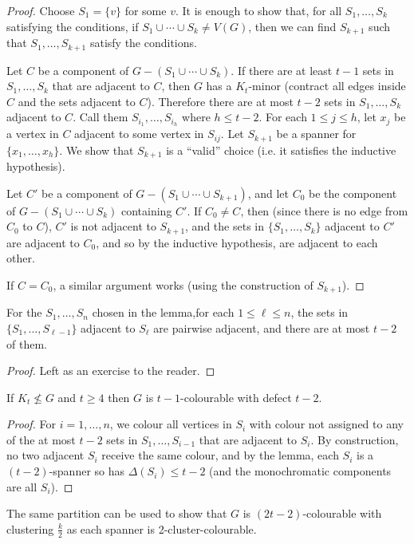 \documentclass[main.tex]{subfiles}
\begin{document}
\begin{proof}
  Choose $S_1 = \{v\}$ for some $v$.
  It is enough to show that, for all $S_1,\ldots,S_k$ satisfying the conditions,
  if $S_1\cup\cdots\cup S_k\neq V(G)$, then we can find $S_{k+1}$ such that
  $S_1,\ldots,S_{k+1}$ satisfy the conditions.

  Let $C$ be a component of $G - (S_1\cup\cdots\cup S_k)$.
  If there are at least $t-1$ sets in $S_1,\ldots,S_k$ that are adjacent to $C$,
  then $G$ has a $K_t$-minor (contract all edges inside $C$ and the sets
  adjacent to $C$).
  Therefore there are at most $t-2$ sets in $S_1,\ldots,S_k$ adjacent to $C$.
  Call them $S_{i_1},\ldots,S_{i_h}$ where $h\leq t-2$.
  For each $1\leq j\leq h$, let $x_j$ be a vertex in $C$ adjacent to some vertex
  in $S_{ij}$.
  Let $S_{k+1}$ be a spanner for $\{x_1,\ldots,x_h\}$.
  We show that $S_{k+1}$ is a ``valid'' choice
  (i.e. it satisfies the inductive hypothesis).

  Let $C'$ be a component of $G - (S_1\cup\cdots\cup S_{k+1})$, and let $C_0$
  be the component of $G - (S_1\cup\cdots\cup S_k)$ containing $C'$.
  If $C_0\neq C$, then (since there is no edge from $C_0$ to $C$),
  $C'$ is not adjacent to $S_{k+1}$, and the sets in $\{S_1,\ldots,S_k\}$
  adjacent to $C'$ are adjacent to $C_0$, and so by the inductive
  hypothesis, are adjacent to each other.

  If $C = C_0$, a similar argument works (using the construction of $S_{k+1}$).
\end{proof}
\begin{corollary}
  For the $S_1,\ldots,S_n$ chosen in the lemma,for each $1\leq\ell\leq n$,
  the sets in $\{S_1,\ldots,S_{\ell-1}\}$ adjacent to $S_\ell$ are pairwise
  adjacent, and there are at most $t-2$ of them.
\end{corollary}
\begin{proof}
  Left as an exercise to the reader.
\end{proof}
\begin{corollary}
  If $K_t\not\leq G$ and $t\geq 4$ then $G$ is $t-1$-colourable with defect $t-2$.
\end{corollary}
\begin{proof}
  For $i = 1, \ldots, n$, we colour all vertices in $S_i$ with colour not
  assigned to any of the at most $t-2$ sets in $S_1,\ldots,S_{i-1}$ that are
  adjacent to $S_i$.
  By construction, no two adjacent $S_i$ receive the same colour,
  and by the lemma, each $S_i$ is a $(t-2)$-spanner so has $\Delta(S_i)\leq t-2$
  (and the monochromatic components are all $S_i$).
\end{proof}
\begin{remark*}
  The same partition can be used to show that $G$ is $(2t-2)$-colourable with
  clustering $\frac{k}{2}$ as each spanner is 2-cluster-colourable.
\end{remark*}
\end{document}
